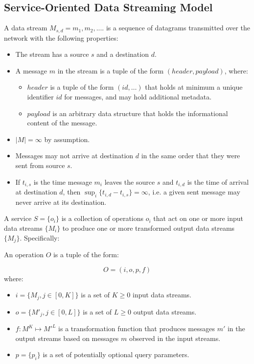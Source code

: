 \subsection{Service-Oriented Data Streaming Model}
\label{sec:rheos_data_streaming_model}


A data stream $M_{s,d} = {m_1, m_2, ....}$ is a sequence of datagrams transmitted over the network with the following properties:

\begin{itemize}
    \item The stream has a source $s$ and a destination $d$.
    \item A message $m$ in the stream is a tuple of the form $(header, payload)$, where:
    \begin{itemize}
        \item $header$ is a tuple of the form $(id, \dots)$ that holds at minimum a unique identifier $id$ for messages, and may hold additional metadata.
        \item $payload$ is an arbitrary data structure that holds the informational content of the message. 
    \end{itemize}
    \item $|M| = \infty$ by assumption.
    \item Messages may not arrive at destination $d$ in the same order that they were sent from source $s$.
    \item If $t_{i,s}$ is the time message $m_i$ leaves the source $s$ and $t_{i,d}$ is the time of arrival at destination $d$, then $\sup_i \{t_{i,d} - t_{i,s}\} = \infty$, i.e. a given sent message may never arrive at its destination.
\end{itemize}

A service $S = \{o_i\}$ is a collection of operations $o_i$ that act on one or more input data streams $\{M_i\}$ to produce one or more transformed output data streams $\{M_j\}$. Specifically:

An operation $O$ is a tuple of the form:

\begin{equation}
\label{eq:service_opertaion_equation}
O = (i,o,p,f)
\end{equation} 
where:
\begin{itemize} 
    \item $i = \{M_j, j \in [0, K]\}$ is a set of $K \ge 0$ input data streams.
    \item $o = \{M'_j, j \in [0, L]\}$ is a set of $L \ge 0$ output data streams.
    \item $f:M^K \mapsto M'^L$ is a transformation function that produces messages $m'$ in the output streams based on messages $m$ observed in the input streams.
    \item $p = \{p_i\}$ is a set of potentially optional query parameters.  
\end{itemize}

